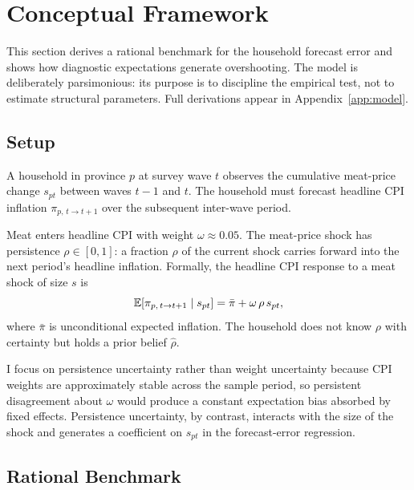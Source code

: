 
\section{Conceptual Framework}\label{sec:framework}

This section derives a rational benchmark for the household
forecast error and shows how diagnostic expectations generate
overshooting.
The model is deliberately parsimonious: its purpose is to
discipline the empirical test, not to estimate structural
parameters.
Full derivations appear in Appendix~\ref{app:model}.

\subsection{Setup}\label{sec:model_setup}

A household in province $p$ at survey wave $t$ observes the
cumulative meat-price change $s_{pt}$ between waves $t-1$ and $t$.
The household must forecast headline CPI inflation
$\pi_{p,\,t \to t+1}$ over the subsequent inter-wave period.

Meat enters headline CPI with weight $\omega \approx 0.05$.
The meat-price shock has persistence $\rho \in [0,1]$: a fraction
$\rho$ of the current shock carries forward into the next period's
headline inflation.
Formally, the headline CPI response to a meat shock of size $s$ is
\begin{equation}\label{eq:passthrough_model}
  \mathbb{E}[\pi_{p,\,t \to t+1} \mid s_{pt}] = \bar{\pi} + \omega\,\rho\,s_{pt},
\end{equation}
where $\bar{\pi}$ is unconditional expected inflation.
The household does not know $\rho$ with certainty but holds a
prior belief $\hat{\rho}$.

I focus on persistence uncertainty rather than weight uncertainty
because CPI weights are approximately stable across the sample
period, so persistent disagreement about $\omega$ would produce
a constant expectation bias absorbed by fixed effects.
Persistence uncertainty, by contrast, interacts with the size
of the shock and generates a coefficient on $s_{pt}$ in the
forecast-error regression.

\subsection{Rational Benchmark}\label{sec:rational_benchmark}

